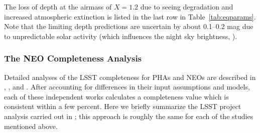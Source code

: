 The loss of depth at the airmass of $X=1.2$ due to seeing degradation
and increased atmospheric extinction is listed in the last row in Table~\ref{tab:eqparams}. Note
that the limiting depth predictions are uncertain by about 0.1--0.2 mag
due to unpredictable solar
activity (which influences the night sky brightness,
\citealt{2008A&A...481..575P}).




\subsubsection{   The NEO Completeness Analysis    }
\label{Sec:NEOc}
Detailed analyses of the LSST completeness for PHAs and NEOs are
described in \citet{2018Icar..303..181J}, \citet{2017AJ....154...12V,2017AJ....154...13V}, and \citet{2016AJ....151..172G}.
After accounting for differences in their input assumptions and models, each of these independent
works calculates a completeness value which is consistent within a few percent.
Here we briefly summarize the LSST project analysis carried out in \citet{2018Icar..303..181J}; this
approach is roughly the same for each of the studies mentioned above.

